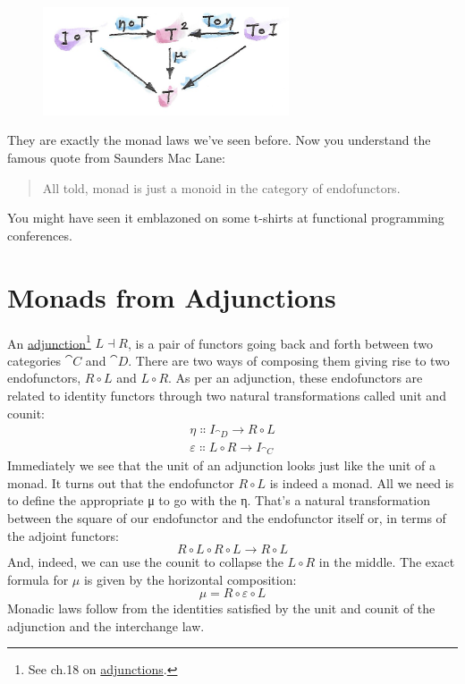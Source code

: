 \begin{figure}[H]
\centering
\includegraphics[width=2.86458in]{images/unitlawcomp.png}
\end{figure}

\noindent
They are exactly the monad laws we've seen before. Now you understand
the famous quote from Saunders Mac Lane:

\begin{quote}
All told, monad is just a monoid in the category of endofunctors.
\end{quote}
You might have seen it emblazoned on some t-shirts at functional
programming conferences.

\section{Monads from Adjunctions}

An \hyperref[adjunctions]{adjunction}\footnote{See ch.18 on \hyperref[adjunctions]{adjunctions}.}
$L \dashv R$, is a pair of functors going back and forth between two
categories $\cat{C}$ and $\cat{D}$. There are two ways of composing them
giving rise to two endofunctors, $R \circ L$ and $L \circ R$.
As per an adjunction, these endofunctors are related to identity
functors through two natural transformations called unit and counit:
\begin{gather*}
\eta \Colon I_{\cat{D}} \to R \circ L \\
\varepsilon \Colon L \circ R \to I_{\cat{C}}
\end{gather*}
Immediately we see that the unit of an adjunction looks just like the
unit of a monad. It turns out that the endofunctor $R \circ L$ is
indeed a monad. All we need is to define the appropriate μ to go with
the η. That's a natural transformation between the square of our
endofunctor and the endofunctor itself or, in terms of the adjoint
functors:
\[R \circ L \circ R \circ L \to R \circ L\]
And, indeed, we can use the counit to collapse the $L \circ R$ in
the middle. The exact formula for $\mu$ is given by the horizontal
composition:
\[\mu = R \circ \varepsilon \circ L\]
Monadic laws follow from the identities satisfied by the unit and counit
of the adjunction and the interchange law.


